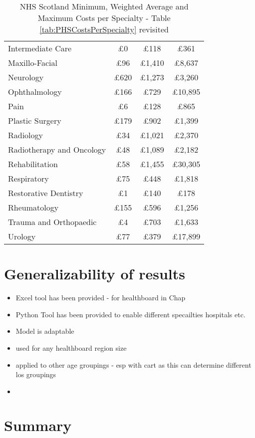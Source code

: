 \documentclass[../thesis.tex]{subfiles}
\begin{document}
\begin{table}[h!]
\begin{tabular}{lccc}
        Intermediate Care & $\pounds$0 & $\pounds$118 & $\pounds$361 \\
        Maxillo-Facial & $\pounds$96 & $\pounds$1,410 & $\pounds$8,637 \\
        Neurology & $\pounds$620 & $\pounds$1,273 & $\pounds$3,260 \\
        Ophthalmology & $\pounds$166 & $\pounds$729 & $\pounds$10,895 \\
        Pain &$\pounds$6 & $\pounds$128 & $\pounds$865 \\
        Plastic Surgery & $\pounds$179 & $\pounds$902 & $\pounds$1,399 \\
        Radiology & $\pounds$34 & $\pounds$1,021 & $\pounds$2,370\\
        Radiotherapy and Oncology & $\pounds$48 & $\pounds$1,089 & $\pounds$2,182 \\ 
        Rehabilitation & $\pounds$58 & $\pounds$1,455 & $\pounds$30,305 \\
        Respiratory & $\pounds$75 & $\pounds$448 & $\pounds$1,818 \\
        Restorative Dentistry & $\pounds$1 & $\pounds$140 & $\pounds$178 \\
        Rheumatology & $\pounds$155 & $\pounds$596 & $\pounds$1,256 \\
        Trauma and Orthopaedic & $\pounds$4 & $\pounds$703 & $\pounds$1,633 \\
        Urology & $\pounds$77 & $\pounds$379 & $\pounds$17,899 \\ \bottomrule
    \end{tabular}
    \caption{NHS Scotland Minimum, Weighted Average and Maximum Costs per Specialty \cite{PHS2021} - Table \ref{tab:PHSCostsPerSpecialty} revisited}
    \label{tab:PHSCostsPerSpecialty2}
\end{table}


\section{Generalizability of results}
\begin{itemize}
\item Excel tool has been provided - for healthboard in Chap
\item Python Tool has been provided to enable different specailties  hospitals etc.
    \item Model is adaptable
    \item used for any healthboard region size
    \item applied to other age groupings - esp with cart as this can determine different los groupings
    \item 
\end{itemize}

\section{Summary}
\end{document}
